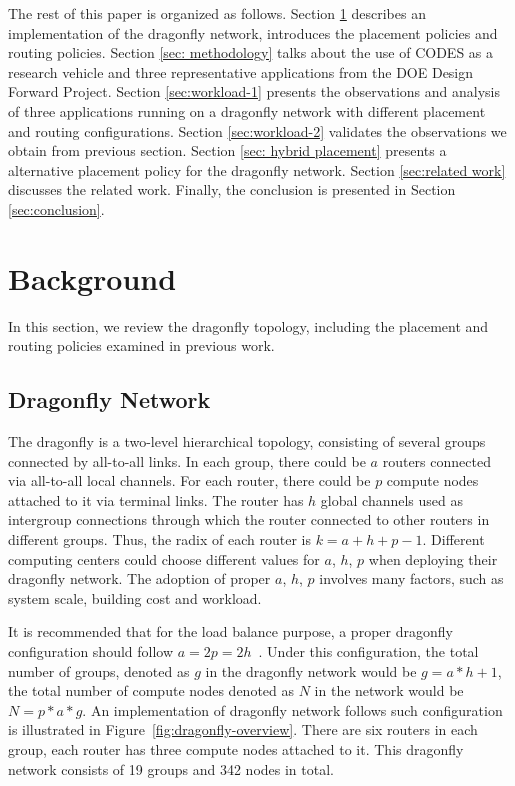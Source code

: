 \documentclass[conference,compsoc]{IEEEtran}
\begin{document}
The rest of this paper is organized as follows. Section \ref{sec:background} describes an implementation of the dragonfly network, introduces the placement policies and routing policies. Section \ref{sec: methodology} talks about the use of CODES as a research vehicle and three representative applications from the DOE Design Forward Project. Section \ref{sec:workload-1} presents the observations and analysis of three applications running on a dragonfly network with different placement and routing configurations. Section \ref{sec:workload-2} validates the observations we obtain from previous section. Section \ref{sec: hybrid placement} presents a alternative placement policy for the dragonfly network. Section \ref{sec:related work} discusses the related work. Finally, the conclusion is presented in Section \ref{sec:conclusion}.

\section{Background}
\label{sec:background}

In this section, we review the dragonfly topology, including the placement and routing policies examined in previous work. 

\subsection{Dragonfly Network}
\label{sec:network}
The dragonfly is a two-level hierarchical topology, consisting of several groups connected by all-to-all links. In each group, there could be $a$ routers connected via all-to-all local channels. For each router, there could be $p$ compute nodes attached to it via terminal links. The router has $h$ global channels used as intergroup connections through which the router connected to other routers in different groups. Thus, the radix of each router is $k = a+h+p-1$. Different computing centers could choose different values for  $a$, $h$, $p$ when deploying their dragonfly network. The adoption of proper $a$, $h$, $p$ involves many factors, such as system scale, building cost and workload. 

It is recommended that for the load balance purpose, a proper dragonfly configuration should follow $a=2p=2h$~\cite{kim-micro}. Under this configuration, the total number of groups, denoted as $g$ in the dragonfly network would be $g = a*h+1 $, the total number of compute nodes denoted as $N$ in the network would be $N = p*a*g $. An implementation of dragonfly network follows such configuration is illustrated in Figure~\ref{fig:dragonfly-overview}. There are six routers in each group, each router has three compute nodes attached to it. This dragonfly network consists of 19 groups and 342 nodes in total.
\end{document}

